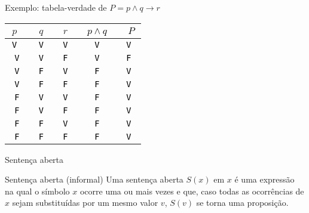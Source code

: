 \begin{frame}[fragile]{Exemplo: tabela-verdade de $P = p \land q \to r$}

    \begin{table}
        \centering
        \begin{tabular}{>{\tt}c>{\tt}c>{\tt}c>{\tt}c>{\tt}c}
            \hline
            $p$ & $q$ & $r$ & \textcolor{black}{$p\land q$} & \textcolor{black}{$P$}\\
            \hline
            \textcolor{black}{V} & \textcolor{black}{V} & \textcolor{black}{V} & \textcolor{black}{V} & \textcolor{black}{V} \\
            \hline
            \textcolor{black}{V} & \textcolor{black}{V} & \textcolor{black}{F} & \textcolor{black}{V} & \textcolor{black}{F} \\
            \hline
            \textcolor{black}{V} & \textcolor{black}{F} & \textcolor{black}{V} & \textcolor{black}{F} & \textcolor{black}{V} \\
            \hline
            \textcolor{black}{V} & \textcolor{black}{F} & \textcolor{black}{F} & \textcolor{black}{F} & \textcolor{black}{V} \\
            \hline
            \textcolor{black}{F} & \textcolor{black}{V} & \textcolor{black}{V} & \textcolor{black}{F} & \textcolor{black}{V} \\
            \hline
            \textcolor{black}{F} & \textcolor{black}{V} & \textcolor{black}{F} & \textcolor{black}{F} & \textcolor{black}{V} \\
            \hline
            \textcolor{black}{F} & \textcolor{black}{F} & \textcolor{black}{V} & \textcolor{black}{F} & \textcolor{black}{V} \\
            \hline
            \textcolor{black}{F} & \textcolor{black}{F} & \textcolor{black}{F} & \textcolor{black}{F} & \textcolor{black}{V} \\
            \hline
        \end{tabular}
    \end{table}
\end{frame}



\begin{frame}[fragile]{Sentença aberta}

    \begin{block}{Sentença aberta (informal)}
        Uma sentença aberta $S(x)$ em $x$ é uma expressão na qual o símbolo $x$ ocorre uma 
        ou mais vezes e que, caso todas as ocorrências de $x$ sejam substituídas por um 
        mesmo valor $v$, $S(v)$ se torna uma proposição.
    \end{block}

\end{frame}

